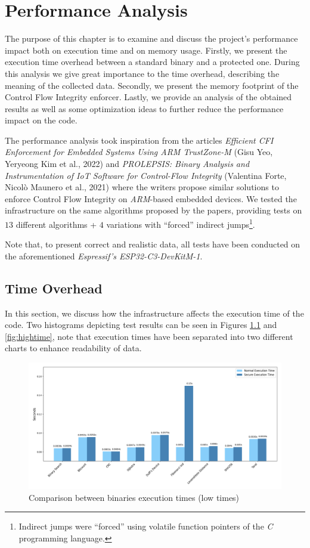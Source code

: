 \chapter{Performance Analysis}
\label{cha:pa}

The purpose of this chapter is to examine and discuss the project's performance
impact both on execution time and on memory usage. Firstly, we present the
execution time overhead between a standard binary and a protected one. During this
analysis we give great importance to the time overhead, describing the meaning
of the collected data. Secondly, we present the memory footprint of the Control
Flow Integrity enforcer. Lastly, we provide an analysis of the obtained results
as well as some optimization ideas to further reduce the performance impact on
the code.

The performance analysis took inspiration from the articles \textit{Efficient
CFI Enforcement for Embedded Systems Using ARM TrustZone-M} (Gisu Yeo, Yeryeong Kim
et al., 2022)\cite{article1} and \textit{PROLEPSIS: Binary Analysis and Instrumentation
of IoT Software for Control-Flow Integrity} (Valentina Forte, Nicol\`{o} Maunero
et al., 2021)\cite{article2} where the writers propose similar solutions to
enforce Control Flow Integrity on \textit{ARM}-based embedded devices. We tested
the infrastructure on the same algorithms proposed by the papers, providing tests
on $13$ different algorithms + $4$ variations with ``forced'' indirect jumps\footnote{Indirect
jumps were ``forced'' using volatile function pointers of the \textit{C} programming
language.}.

Note that, to present correct and realistic data, all tests have been conducted
on the aforementioned \textit{Espressif's ESP32-C3-DevKitM-1}.

\section{Time Overhead}
\label{sec:pa_time}

In this section, we discuss how the infrastructure affects the execution time of
the code. Two histograms depicting test results can be seen in Figures
\ref{fig:lowtime} and \ref{fig:hightime}, note that execution times have been separated
into two different charts to enhance readability of data.

\begin{figure}[htbp]
  \centering
  \includegraphics[width=\linewidth]{images/low_times.png}
  \caption{Comparison between binaries execution times (low times)}
  \label{fig:lowtime}
\end{figure}

